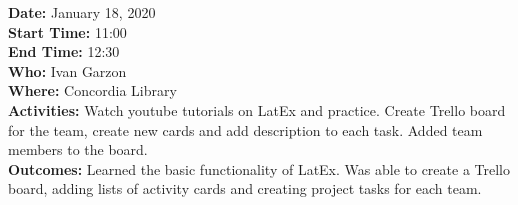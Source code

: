\documentclass[12pt]{article}
\begin{document}
{\bf Date:} January 18, 2020\\
{\bf Start Time:} 11:00\\
{\bf End Time:} 12:30\\
{\bf Who:} Ivan Garzon\\
{\bf Where:} Concordia Library\\
{\bf Activities:} Watch youtube tutorials on LatEx and practice. Create Trello board for the team, create new cards and add description to each task. Added team members to the board. \\
{\bf Outcomes:} Learned the basic functionality of LatEx. Was able to create a Trello board, adding lists of activity cards and creating project tasks for each team.\\\\


\end{document}
